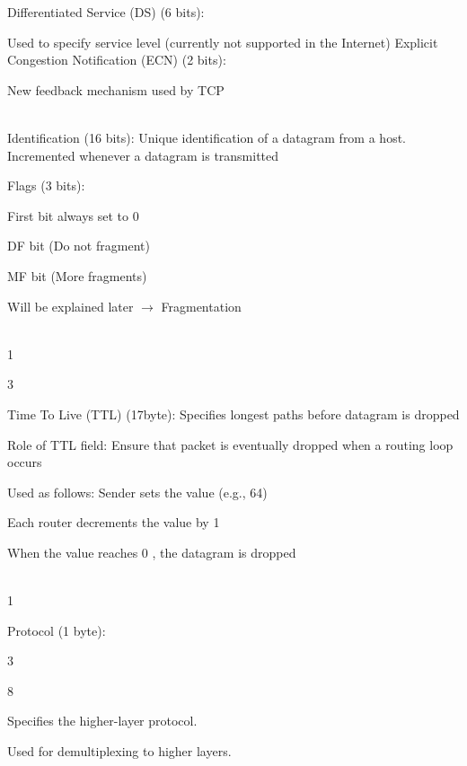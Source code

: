 \begin{description}
\bi
 \ite Differentiated Service (DS) (6 bits):
 \ei


\bi
  \ite Used to specify service level (currently not supported in the Internet)
\ei
\bi
 \ite Explicit Congestion Notification (ECN) (2 bits):
 \ei


\textbullet{} New feedback mechanism used by TCP

\os{\newpage}\item[{\rot\bf Fields of the IP Header } ]~\\[-3ex]


\bi
  \ite Identification (16 bits): Unique identification of a datagram from a host. Incremented whenever a datagram is transmitted

  \ite Flags (3 bits):

  \ite First bit always set to 0

\ei
\bi
 \ite DF bit (Do not fragment)
 \ei

\bi
 \ite MF bit (More fragments)
 \ei


Will be explained later $\rightarrow$ Fragmentation


\os{\newpage}\item[{\rot\bf  Fields of the IP Header }]~\\[-3ex]

1

3

\bi
  \ite Time To Live (TTL) (17byte):
\ei
\bi
 \ite Specifies longest paths before datagram is dropped
 \ei

\bi
 \ite Role of TTL field: Ensure that packet is eventually dropped when a routing loop occurs
 \ei


Used as follows:
\bi
 \ite Sender sets the value (e.g., 64)
 \ei

\bi
 \ite Each router decrements the value by 1
 \ei

\bi
 \ite When the value reaches 0 , the datagram is dropped
 \ei



\os{\newpage}\item[{\rot\bf  Fields of the IP Header }]~\\[-3ex]

1

\bi
  \ite Protocol (1 byte):
\ei

3

8

\bi
  \ite Specifies the higher-layer protocol.
\ei

\bi
  \ite Used for demultiplexing to higher layers.
\ei


\end{description}
